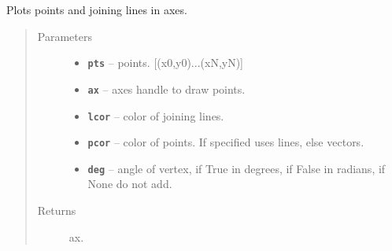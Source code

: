 \documentclass[letterpaper,10pt,english]{sphinxmanual}
\begin{document}
\begin{fulllineitems}
\label{RRtoolbox.lib:RRtoolbox.lib.plotter.plotPointsContour}
Plots points and joining lines in axes.
\begin{quote}\begin{description}
\item[{Parameters}] \leavevmode\begin{itemize}
\item {} 
\textbf{\texttt{pts}} -- points. {[}(x0,y0)...(xN,yN){]}

\item {} 
\textbf{\texttt{ax}} -- axes handle to draw points.

\item {} 
\textbf{\texttt{lcor}} -- color of joining lines.

\item {} 
\textbf{\texttt{pcor}} -- color of points. If specified uses lines, else vectors.

\item {} 
\textbf{\texttt{deg}} -- angle of vertex, if True in degrees, if False in radians, if None do not add.

\end{itemize}

\item[{Returns}] \leavevmode
ax.

\end{description}\end{quote}

\end{fulllineitems}

\end{document}
